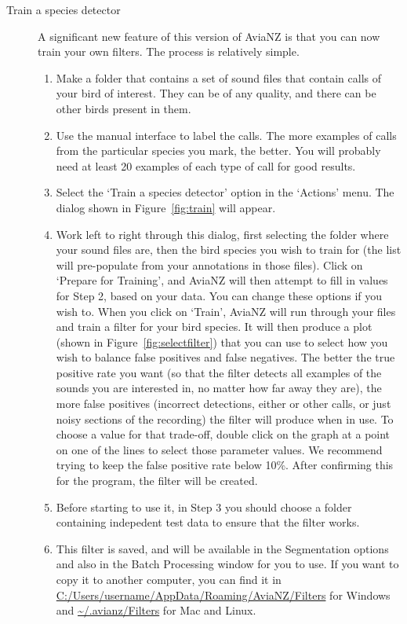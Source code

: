 \documentclass{article}
\begin{document}
\begin{description}
\item [Train a species detector] A significant new feature of this version of AviaNZ is that you can now train your own filters. The process is relatively simple. 
    \begin{enumerate}
    \item Make a folder that contains a set of sound files that contain calls of your bird of interest. They can be of any quality, and there can be other birds present in them. 
    \item Use the manual interface to label the calls. The more examples of calls from the particular species you mark, the better. You will probably need at least 20 examples of each type of call for good results.
    \item Select the `Train a species detector' option in the `Actions' menu. The dialog shown in Figure~\ref{fig:train} will appear. 
    \item Work left to right through this dialog, first selecting the folder where your sound files are, then the bird species you wish to train for (the list will pre-populate from your annotations in those files). Click on `Prepare for Training', and AviaNZ will then attempt to fill in values for Step 2, based on your data. You can change these options if you wish to. When you click on `Train', AviaNZ will run through your files and train a filter for your bird species. It will then produce a plot (shown in Figure~\ref{fig:selectfilter}) that you can use to select how you wish to balance false positives and false negatives. The better the true positive rate you want (so that the filter detects all examples of the sounds you are interested in, no matter how far away they are), the more false positives (incorrect detections, either or other calls, or just noisy sections of the recording) the filter will produce when in use. 
    To choose a value for that trade-off, double click on the graph at a point on one of the lines to select those parameter values. We recommend trying to keep the false positive rate below 10\%. After confirming this for the program, the filter will be created.
    \item Before starting to use it, in Step 3 you should choose a folder containing indepedent test data to ensure that the filter works. 
    \item This filter is saved, and will be available in the Segmentation options and also in the Batch Processing window for you to use. If you want to copy it to another computer, you can find it in \url{C:/Users/username/AppData/Roaming/AviaNZ/Filters} for Windows and \url{~/.avianz/Filters} for Mac and Linux.
    \end{enumerate}


\end{description}
\end{document}
